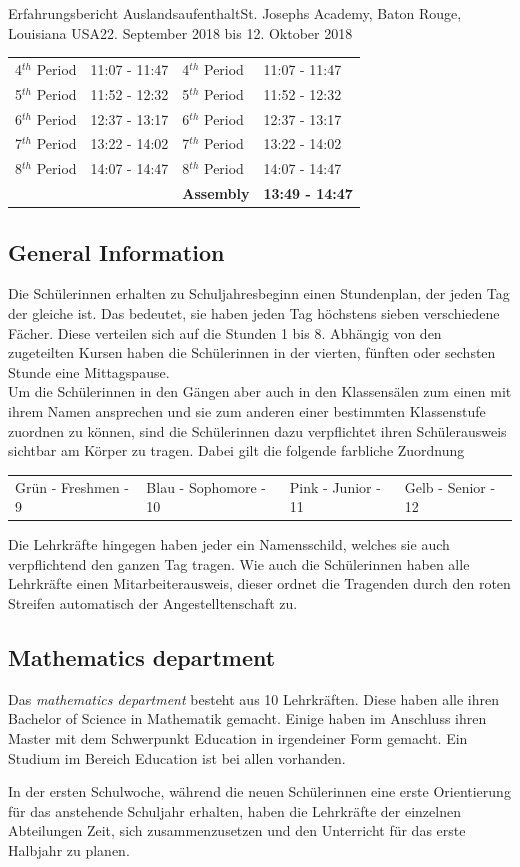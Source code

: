 \documentclass[oneside,openany,headings=optiontotoc,11pt,numbers=noenddot]{article}
\begin{document}
\begin{worksheet}{Erfahrungsbericht Auslandsaufenthalt}{St. Joseph\grq{}s Academy, Baton Rouge, Louisiana USA}{22. September 2018 bis 12. Oktober 2018}
\begin{tabularx}{\textwidth}{X|X||X|X}
			\cline{1-2}
			4\(^{th}\) Period & 11:07 - 11:47 & 4\(^{th}\) Period & 11:07 - 11:47\\
			5\(^{th}\) Period & 11:52 - 12:32 & 5\(^{th}\) Period & 11:52 - 12:32\\
			6\(^{th}\) Period & 12:37 - 13:17 & 6\(^{th}\) Period & 12:37 - 13:17\\
			7\(^{th}\) Period & 13:22 - 14:02 & 7\(^{th}\) Period & 13:22 - 14:02\\
			8\(^{th}\) Period & 14:07 - 14:47 & 8\(^{th}\) Period & 14:07 - 14:47\\
			\cline{3-4}
			& & \textbf{Assembly} & \textbf{13:49 - 14:47}\\
			\cline{3-4}
		\end{tabularx}
		\normalsize
		\subsection{General Information}
		Die Schülerinnen erhalten zu Schuljahresbeginn einen Stundenplan, der jeden Tag der gleiche ist. Das bedeutet, sie haben jeden Tag höchstens sieben verschiedene Fächer. Diese verteilen sich auf die Stunden 1 bis 8. Abhängig von den zugeteilten Kursen haben die Schülerinnen in der vierten, fünften oder sechsten Stunde eine Mittagspause.\\
		Um die Schülerinnen in den Gängen aber auch in den Klassensälen zum einen mit ihrem Namen ansprechen und sie zum anderen einer bestimmten Klassenstufe zuordnen zu können, sind die Schülerinnen dazu verpflichtet ihren Schülerausweis sichtbar am Körper zu tragen. Dabei gilt die folgende farbliche Zuordnung\\
		\begin{tabularx}{\textwidth}{llll}
			Grün - Freshmen - 9 & Blau - Sophomore - 10 & Pink - Junior - 11 & Gelb - Senior - 12
		\end{tabularx}
		Die Lehrkräfte hingegen haben jeder ein Namensschild, welches sie auch verpflichtend den ganzen Tag tragen. Wie auch die Schülerinnen haben alle Lehrkräfte einen \grqq{}Mitarbeiterausweis\grqq{}, dieser ordnet die Tragenden durch den roten Streifen automatisch der Angestelltenschaft zu.
		\subsection{Mathematics department}
		Das \textit{mathematics department} besteht aus 10 Lehrkräften. Diese haben alle ihren Bachelor of Science in Mathematik gemacht. Einige haben im Anschluss ihren Master mit dem Schwerpunkt Education in irgendeiner Form gemacht. Ein Studium im Bereich Education ist bei allen vorhanden.\\
		\par\noindent
		In der ersten Schulwoche, während die neuen Schülerinnen eine erste Orientierung für das anstehende Schuljahr erhalten, haben die Lehrkräfte der einzelnen Abteilungen Zeit, sich zusammenzusetzen und den Unterricht für das erste Halbjahr zu planen.

\end{worksheet}
\end{document}
